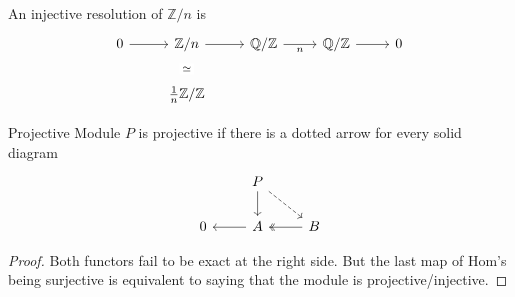 An injective resolution of $\mathbb{Z}/n$ is
\[\begin{tikzcd}
	0 & {\mathbb{Z}/n} & {\mathbb{Q}/\mathbb{Z}} & {\mathbb{Q}/\mathbb{Z}} & 0 \\
	& {\frac{1}{n}\mathbb{Z}/\mathbb{Z}}
	\arrow[from=1-1, to=1-2]
	\arrow[from=1-2, to=1-3]
	\arrow["\simeq"{description}, draw=none, from=1-2, to=2-2]
	\arrow["n"', from=1-3, to=1-4]
	\arrow[from=1-4, to=1-5]
\end{tikzcd}\]
\begin{adefinition}{Projective Module}{}
    $P$ is projective if there is a dotted arrow for every solid diagram 
\[\begin{tikzcd}
	& P \\
	0 & A & B
	\arrow[from=1-2, to=2-2]
	\arrow[dashed, from=1-2, to=2-3]
	\arrow[from=2-2, to=2-1]
	\arrow[two heads, from=2-3, to=2-2]
\end{tikzcd}\]
\end{adefinition}

\begin{proof}
    Both functors fail to be exact at the right side. But the last map of Hom's being surjective is equivalent to saying that the module is projective/injective.
\end{proof}

